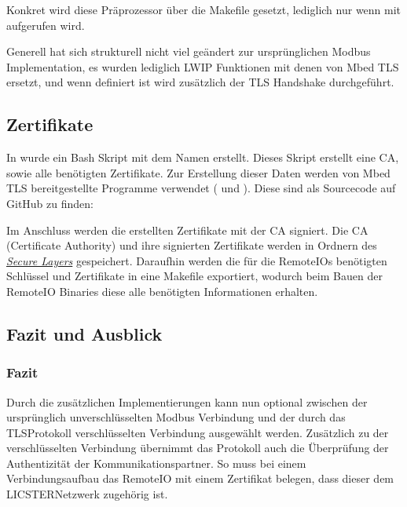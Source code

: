 \documentclass[letterpaper,10pt,ngerman]{sphinxmanual}
\begin{document}
Konkret wird diese Präprozessor über die Makefile gesetzt, lediglich nur wenn  mit  aufgerufen wird.

Generell hat sich strukturell nicht viel geändert zur ursprünglichen Modbus Implementation, es wurden lediglich LWIP Funktionen mit denen von Mbed TLS ersetzt, und wenn  definiert ist wird zusätzlich der TLS Handshake durchgeführt.


\subsection{Zertifikate}
\label{\detokenize{seccom:zertifikate}}
In  wurde ein Bash Skript mit dem Namen  erstellt.
Dieses Skript erstellt eine CA, sowie alle benötigten Zertifikate.
Zur Erstellung dieser Daten werden von Mbed TLS bereitgestellte Programme verwendet ( und ). Diese sind als Sourcecode auf GitHub zu finden:

Im Anschluss werden die erstellten Zertifikate mit der CA signiert.
Die CA (Certificate Authority) und ihre signierten Zertifikate werden in Ordnern des {\hyperref[\detokenize{seccom:secure-layer}]{\emph{Secure Layers}}} gespeichert.
Daraufhin werden die für die Remote\sphinxhyphen{}IOs benötigten Schlüssel und Zertifikate in eine Makefile exportiert, wodurch beim Bauen der Remote\sphinxhyphen{}IO Binaries diese alle benötigten Informationen erhalten.


\subsection{Fazit und Ausblick}
\label{\detokenize{seccom:fazit-und-ausblick}}



\subsubsection{Fazit}
\label{\detokenize{seccom:fazit}}
Durch die zusätzlichen Implementierungen kann nun optional zwischen der ursprünglich unverschlüsselten Modbus Verbindung und der durch das TLS\sphinxhyphen{}Protokoll verschlüsselten Verbindung ausgewählt werden. Zusätzlich zu der verschlüsselten Verbindung übernimmt das Protokoll auch die Überprüfung der Authentizität der Kommunikationspartner. So muss bei einem Verbindungsaufbau das Remote\sphinxhyphen{}IO mit einem Zertifikat belegen, dass dieser dem LICSTER\sphinxhyphen{}Netzwerk zugehörig ist.
\end{document}
